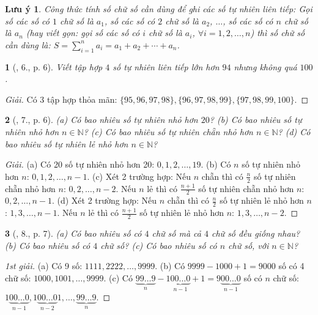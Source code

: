 \documentclass{article}
\newtheorem{baitoan}{}
\newtheorem{luuy}{Lưu ý}
\begin{document}
\begin{luuy}
	Công thức tính số chữ số cần dùng để ghi các số tự nhiên liên tiếp: Gọi số các số có $1$ chữ số là $a_1$, số các số có $2$ chữ số là $a_2$, $\ldots$,  số các số có $n$ chữ số là $a_n$ (hay viết gọn: gọi số các số có $i$ chữ số là $a_i$, $\forall i = 1,2,\ldots,n$) thì số chữ số cần dùng là: $S = \sum_{i=1}^n a_i = a_1 + a_2 + \cdots + a_n$.
\end{luuy}

\begin{baitoan}[\cite{Tuyen_Toan_6}, 6., p. 6]
	Viết tập hợp $4$ số tự nhiên liên tiếp lớn hơn $94$ nhưng không quá $100$.
\end{baitoan}

\begin{proof}[Giải]
	Có 3 tập hợp thỏa mãn: $\{95,96,97,98\},\{96,97,98,99\},\{97,98,99,100\}$.
\end{proof}

\begin{baitoan}[\cite{Tuyen_Toan_6}, 7., p. 6]
	(a) Có bao nhiêu số tự nhiên nhỏ hơn $20$? (b) Có bao nhiêu số tự nhiên nhỏ hơn $n\in\mathbb{N}$? (c) Có bao nhiêu số tự nhiên chẵn nhỏ hơn $n\in\mathbb{N}$? (d) Có bao nhiêu số tự nhiên lẻ nhỏ hơn $n\in\mathbb{N}$?
\end{baitoan}

\begin{proof}[Giải]
	(a) Có 20 số tự nhiên nhỏ hơn 20: $0,1,2,\ldots,19$. (b) Có $n$ số tự nhiên nhỏ hơn $n$: $0,1,2,\ldots,n - 1$. (c) Xét 2 trường hợp: Nếu $n$ chẵn thì có $\frac{n}{2}$ số tự nhiên chẵn nhỏ hơn $n$: $0,2,\ldots,n - 2$. Nếu $n$ lẻ thì có $\frac{n + 1}{2}$ số tự nhiên chẵn nhỏ hơn $n$: $0,2,\ldots,n - 1$. (d) Xét 2 trường hợp: Nếu $n$ chẵn thì có $\frac{n}{2}$ số tự nhiên lẻ nhỏ hơn $n$: $1,3,\ldots,n - 1$. Nếu $n$ lẻ thì có $\frac{n + 1}{2}$ số tự nhiên lẻ nhỏ hơn $n$: $1,3,\ldots,n - 2$.
\end{proof}

\begin{baitoan}[\cite{Tuyen_Toan_6}, 8., p. 7]
	(a) Có bao nhiêu số có $4$ chữ số mà cả $4$ chữ số đều giống nhau? (b) Có bao nhiêu số có $4$ chữ số? (c) Có bao nhiêu số có $n$ chữ số, với $n\in\mathbb{N}$?
\end{baitoan}

\begin{proof}[1st giải]
	(a) Có 9 số: $1111,2222,\ldots,9999$. (b) Có $9999 - 1000 + 1 = 9000$ số có 4 chữ số: $1000,1001,\ldots,9999$. (c) Có $\underbrace{99\ldots9}_n - 1\underbrace{00\ldots0}_{n-1} + 1 = 9\underbrace{00\ldots0}_{n-1}$ số có $n$ chữ số: $1\underbrace{00\ldots0}_{n-1},1\underbrace{00\ldots0}_{n-2}1,\ldots,\underbrace{99\ldots9}_n$.
\end{proof}
\end{document}
